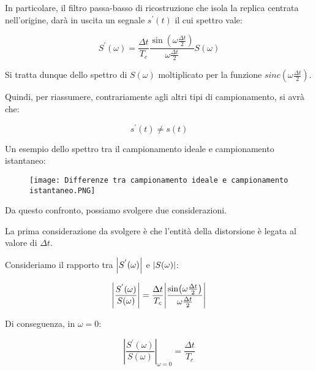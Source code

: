 In particolare, il filtro passa-basso di ricostruzione che isola la replica centrata nell'origine, 
darà in uscita un segnale $s^{'} (t)$ il cui spettro vale: 

{
    \Large 
    \begin{equation}
        S^{'} (\omega) = 
        \frac{\Delta t}{T_c} 
        \frac{\sin(\omega \frac{\Delta t}{2})}{\omega \frac{\Delta t}{2}} 
        S(\omega)
    \end{equation}
}

Si tratta dunque dello spettro di $S(\omega)$ moltiplicato per la funzione $sinc(\omega \frac{\Delta t}{2})$. 

Quindi, per riassumere, contrariamente agli altri tipi di campionamento, si avrà che: 

{
    \Large 
    \begin{equation}
        s^{'} (t) \neq s(t)
    \end{equation}
}

Un esempio dello spettro tra il campionamento ideale e campionamento istantaneo: 

\begin{figure}[h]
    \centering
    \texttt{[image: Differenze tra campionamento ideale e campionamento istantaneo.PNG]}
\end{figure} 

\newpage 

Da questo confronto, possiamo svolgere due considerazioni. \newline

La prima considerazione da svolgere è che l'entità della distorsione è legata al valore di $\Delta t$. \newline 

Consideriamo il rapporto tra $\abs{S^{'} (\omega)}$ e $\abs{S(\omega)}$: 

{
    \Large 
    \begin{equation}
        \abs{\frac{S^{'} (\omega)}{S(\omega)}}
        = 
        \frac{\Delta t}{T_c}
        \abs{\frac{\sin(\omega \frac{\Delta t}{2})}{\omega \frac{\Delta t}{2}}} 
    \end{equation}
}

Di conseguenza, in $\omega = 0$: 

{
    \Large 
    \begin{equation}
        \left|\frac{S^{'} (\omega)}{S(\omega)} \right|_{\omega = 0} 
        = 
        \frac{\Delta t}{T_c}
    \end{equation}
} 

